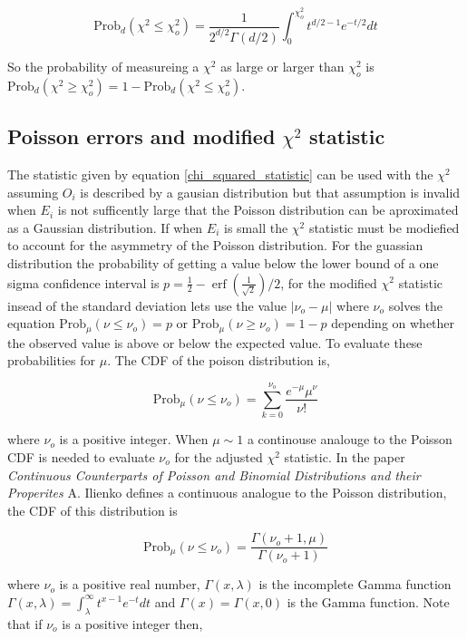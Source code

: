 \documentclass[%
 reprint,
 amsmath,amssymb,
 aps,
]{revtex4-1}
\begin{document}
\begin{equation}
\text{Prob}_d(\chi^2 \leq \chi_o^2)=\frac{1}{2^{d/2}\Gamma(d/2)}\int_0^{\chi_o^2} t^{d/2-1}e^{-t/2}dt
\label{chi_squared_prob}
\end{equation}

So the probability of measureing a $\chi^2$ as large or larger than $\chi_o^2$ is $\text{Prob}_d(\chi^2 \geq \chi_o^2)=1-\text{Prob}_d(\chi^2 \leq \chi_o^2)$.

\subsection{Poisson errors and modified $\chi^2$ statistic}
The statistic given by equation \eqref{chi_squared_statistic} can be used with the $\chi^2$ assuming $O_i$ is described by a gausian distribution but that assumption is invalid when $E_i$ is not sufficently large that the Poisson distribution can be aproximated as a Gaussian distribution. If when $E_i$ is small the $\chi^2$ statistic must be modiefied to account for the asymmetry of the Poisson distribution. For the guassian distribution the probability of getting a value below the lower bound of a one sigma confidence interval is $p=\frac{1}{2} - \operatorname{erf}({\frac{1}{\sqrt{2}}})/2$, for the modified $\chi^2$ statistic insead of the standard deviation lets use the value $\left|\nu_o - \mu\right|$ where $\nu_o$ solves the equation $\text{Prob}_\mu\left(\nu \leq \nu_o\right)=p$ or $\text{Prob}_\mu\left(\nu \geq \nu_o\right)=1-p$ depending on whether the observed value is above or below the expected value. To evaluate these probabilities for $\mu$. The CDF of the poison distribution is,

\[
\text{Prob}_\mu\left(\nu \leq \nu_o\right)=\sum_{k=0}^{\nu_o}\frac{e^{-\mu}\mu^\nu}{\nu!}
\]

where $\nu_o$ is a positive integer. When $\mu \sim 1$ a continouse analouge to the Poisson CDF is needed to evaluate $\nu_o$ for the adjusted $\chi^2$ statistic. In the paper \textit{Continuous Counterparts of Poisson and Binomial Distributions and their Properites}\cite{continuous_poisson_paper} A. Ilienko defines a continuous analogue to the Poisson distribution, the CDF of this distribution is

\[
\text{Prob}_\mu\left(\nu \leq \nu_o\right)=\frac{\Gamma(\nu_o+1, \mu)}{\Gamma(\nu_o + 1)}
\]

where $\nu_o$ is a positive real number, $\Gamma(x, \lambda)$ is the incomplete Gamma function $\Gamma(x, \lambda)=\int_\lambda^\infty t^{x-1}e^{-t}dt$ and $\Gamma(x)=\Gamma(x, 0)$ is the Gamma function. Note that if $\nu_o$ is a positive integer then,
\end{document}
